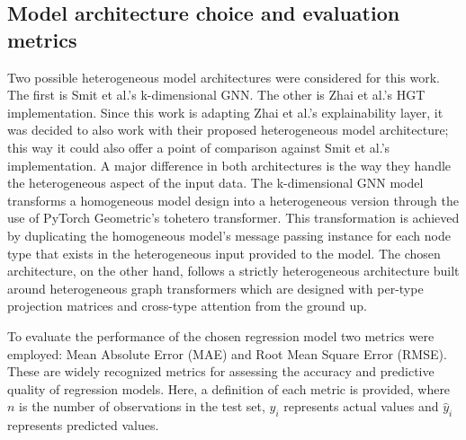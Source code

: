     \subsection{Model architecture choice and evaluation metrics}
        Two possible heterogeneous model architectures were considered for this work. The first is Smit et al.'s \cite{smit2024} k-dimensional GNN. The other is Zhai et al.'s \cite{zhai2025} HGT implementation. Since this work is adapting Zhai et al.'s explainability layer, it was decided to also work with their proposed heterogeneous model architecture; this way it could also offer a point of comparison against Smit et al.'s implementation.
        A major difference in both architectures is the way they handle the heterogeneous aspect of the input data. The k-dimensional GNN model transforms a homogeneous model design into a heterogeneous version through the use of PyTorch Geometric's to\textunderscore hetero transformer. This transformation is achieved by duplicating the homogeneous model's message passing instance for each node type that exists in the heterogeneous input provided to the model. The chosen architecture, on the other hand, follows a strictly heterogeneous architecture built around heterogeneous graph transformers which are designed with per-type projection matrices and cross-type attention from the ground up. 

        To evaluate the performance of the chosen regression model two metrics were employed: Mean Absolute Error (MAE) and Root Mean Square Error (RMSE). These are widely recognized metrics for assessing the accuracy and predictive quality of regression models. Here, a definition of each metric is provided, where $n$ is the number of observations in the test set, $y_i$ represents actual values and $\hat{y}_i$ represents predicted values.

